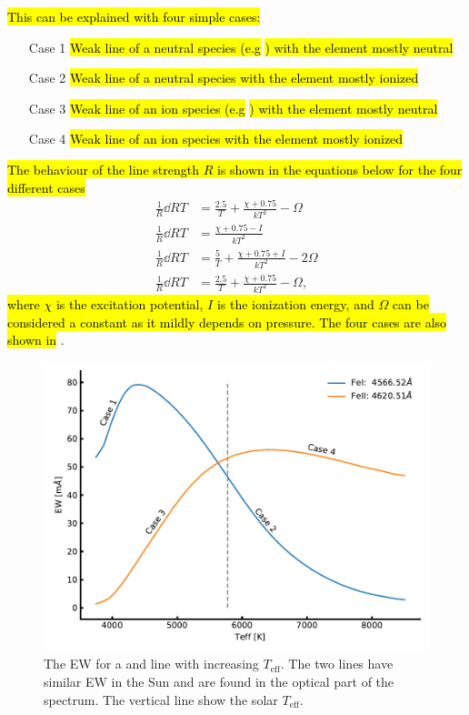 \hl{This can be explained with four simple cases:}
\begin{itemize}
  \item[Case 1] \hl{Weak line of a neutral species (e.g} \hl{) with the element mostly neutral}
  \item[Case 2] \hl{Weak line of a neutral species with the element mostly ionized}
  \item[Case 3] \hl{Weak line of an ion species (e.g} \hl{) with the element mostly neutral}
  \item[Case 4] \hl{Weak line of an ion species with the element mostly ionized}
\end{itemize}
\hl{The behaviour of the line strength $R$ is shown in the equations below for the four different
cases}
\begin{align}
  \frac{1}{R}\dd{R}{T} &= \frac{2.5}{T} + \frac{\chi+0.75}{kT^2}-\Omega  \tag*{Case 1} \\
  \frac{1}{R}\dd{R}{T} &= \frac{\chi+0.75-I}{kT^2}                       \tag*{Case 2} \\
  \frac{1}{R}\dd{R}{T} &= \frac{5}{T} + \frac{\chi+0.75+I}{kT^2}-2\Omega \tag*{Case 3} \\
  \frac{1}{R}\dd{R}{T} &= \frac{2.5}{T} + \frac{\chi+0.75}{kT^2}-\Omega, \tag*{Case 4}
\end{align}
\hl{where $\chi$ is the excitation potential, $I$ is the ionization energy, and $\Omega$ can be
considered a constant as it mildly depends on pressure. The four cases are also shown in}
.

\begin{figure}[htpb!]
    \centering
    \includegraphics[width=0.85\linewidth]{figures/ewTeff.pdf}
    \caption{The EW for a  and  line with increasing $T_\mathrm{eff}$. The
             two lines have similar EW in the Sun and are found in the optical part of the spectrum.
             The vertical line show the solar $T_\mathrm{eff}$.}
    \label{fig:ewTeff}
\end{figure}


